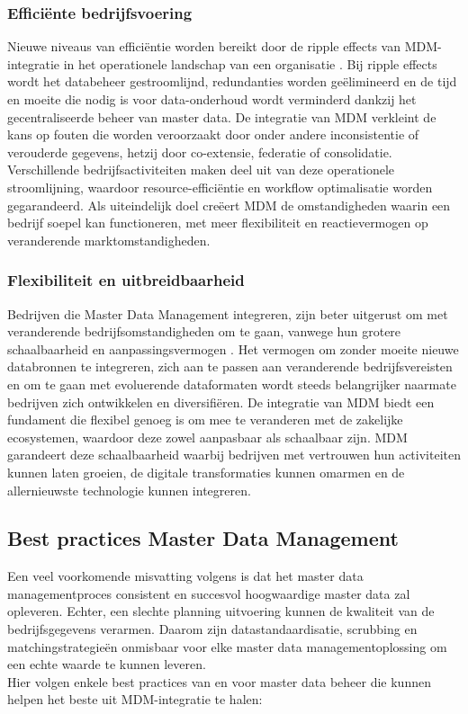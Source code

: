 \subsubsection{Efficiënte bedrijfsvoering }

Nieuwe niveaus van efficiëntie worden bereikt door de ripple effects van MDM-integratie in het operationele landschap van een organisatie \autocite{Pansara2024}. Bij ripple effects wordt het databeheer gestroomlijnd, redundanties worden geëlimineerd en de tijd en moeite die nodig is voor data-onderhoud wordt verminderd dankzij het gecentraliseerde beheer van master data. De integratie van MDM verkleint de kans op fouten die worden veroorzaakt door onder andere inconsistentie of verouderde gegevens, hetzij door co-extensie, federatie of consolidatie. Verschillende bedrijfsactiviteiten maken deel uit van deze operationele stroomlijning, waardoor resource-efficiëntie en workflow optimalisatie worden gegarandeerd. Als uiteindelijk doel creëert MDM de omstandigheden waarin een bedrijf soepel kan functioneren, met meer flexibiliteit en reactievermogen op veranderende marktomstandigheden.

\subsubsection{Flexibiliteit en uitbreidbaarheid}
Bedrijven die Master Data Management integreren, zijn beter uitgerust om met veranderende bedrijfsomstandigheden om te gaan, vanwege hun grotere schaalbaarheid en aanpassingsvermogen \autocite{Pansara2024}. Het vermogen om zonder moeite nieuwe databronnen te integreren, zich aan te passen aan veranderende bedrijfsvereisten en om te gaan met evoluerende dataformaten wordt steeds belangrijker naarmate bedrijven zich ontwikkelen en diversifiëren. De integratie van MDM biedt een fundament die flexibel genoeg is om mee te veranderen met de zakelijke ecosystemen, waardoor deze zowel aanpasbaar als schaalbaar zijn. MDM garandeert deze schaalbaarheid waarbij bedrijven met vertrouwen hun activiteiten kunnen laten groeien, de digitale transformaties kunnen omarmen en de allernieuwste technologie kunnen integreren.

\subsection{Best practices Master Data Management}
Een veel voorkomende misvatting volgens \textcite{Raghavendra2023} is dat het master data managementproces consistent en succesvol hoogwaardige master data zal opleveren. Echter, een slechte planning uitvoering kunnen de kwaliteit van de bedrijfsgegevens verarmen. Daarom zijn datastandaardisatie, scrubbing en matchingstrategieën onmisbaar voor elke master data managementoplossing om een echte waarde te kunnen leveren.
\\Hier volgen enkele best practices van \textcite{Raghavendra2023} en \textcite{Sharma2023} voor master data beheer die kunnen helpen het beste uit MDM-integratie te halen:

